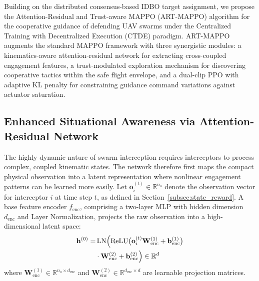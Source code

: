 \documentclass[lettersize,journal]{IEEEtran}
\begin{document}
Building on the distributed consensus-based IDBO target assignment, we propose the Attention-Residual and Trust-aware MAPPO (ART-MAPPO) algorithm for the cooperative guidance of defending UAV swarms under the Centralized Training with Decentralized Execution (CTDE) paradigm. ART-MAPPO augments the standard MAPPO framework with three synergistic modules: a kinematics-aware attention-residual network for extracting cross-coupled engagement features, a trust-modulated exploration mechanism for discovering cooperative tactics within the safe flight envelope, and a dual-clip PPO with adaptive KL penalty for constraining guidance command variations against actuator saturation.

\subsection{Enhanced Situational Awareness via Attention-Residual Network}
\label{subsec:attention_residual}

The highly dynamic nature of swarm interception requires interceptors to process complex, coupled kinematic states. The network therefore first maps the compact physical observation into a latent representation where nonlinear engagement patterns can be learned more easily. Let $\mathbf{o}_i^{(t)} \in \mathbb{R}^{n_o}$ denote the observation vector for interceptor $i$ at time step $t$, as defined in Section~\ref{subsec:state_reward}. A base feature encoder $f_{\mathrm{enc}}$, comprising a two-layer MLP with hidden dimension $d_{\mathrm{enc}}$ and Layer Normalization, projects the raw observation into a high-dimensional latent space:
\begin{equation}
\label{eq:encoder}
\begin{split}
\mathbf{h}^{(0)} =& \operatorname{LN}\Bigl(\operatorname{ReLU}\bigl(\mathbf{o}_i^{(t)}\mathbf{W}_{\mathrm{enc}}^{(1)} + \mathbf{b}_{\mathrm{enc}}^{(1)}\bigr) \\
&\cdot \mathbf{W}_{\mathrm{enc}}^{(2)} + \mathbf{b}_{\mathrm{enc}}^{(2)}\Bigr) \in \mathbb{R}^{d}
\end{split}
\end{equation}
where $\mathbf{W}_{\mathrm{enc}}^{(1)} \in \mathbb{R}^{n_o \times d_{\mathrm{enc}}}$ and $\mathbf{W}_{\mathrm{enc}}^{(2)} \in \mathbb{R}^{d_{\mathrm{enc}} \times d}$ are learnable projection matrices.
\end{document}

